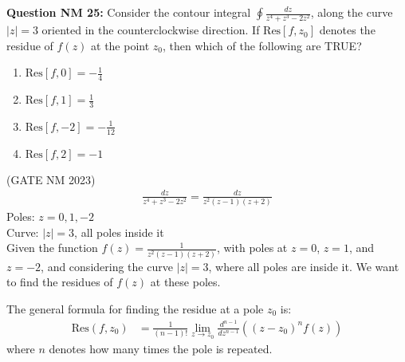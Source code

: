\documentclass[journal,12pt,twocolumn]{IEEEtran}
\theoremstyle{remark}
\begin{document}
\title{}
\author{Sasa Mardi, EE23BTECH11222}
\date{}
\maketitle

\textbf{Question NM 25:} Consider the contour integral $\oint \frac{dz}{z^4 + z^3 - 2z^2}$, along the curve $|z| = 3$ oriented in the counterclockwise direction. If $\text{Res}[f, z_0]$ denotes the residue of $f(z)$ at the point $z_0$, then which of the following are TRUE? \\
\begin{enumerate}
    \item $\text{Res}[f, 0] = -\frac{1}{4}$
    \item $\text{Res}[f, 1] = \frac{1}{3}$
    \item $\text{Res}[f, -2] = -\frac{1}{12}$
    \item $\text{Res}[f, 2] = -1$
\end{enumerate}
\hfill{(GATE NM 2023)}\\
\solution
\begin{align}
\frac{dz}{z^4 + z^3 - 2z^2} = \frac{dz}{z^2(z-1)(z+2)}
\end{align}
Poles: $z = 0, 1, -2$ \\
Curve: $|z| = 3$, all poles inside it \\
Given the function $f(z) = \frac{1}{z^2(z-1)(z+2)}$, with poles at $z = 0$, $z = 1$, and $z = -2$, and considering the curve $|z| = 3$, where all poles are inside it. We want to find the residues of $f(z)$ at these poles.

The general formula for finding the residue at a pole $z_0$ is:
\begin{align}
\text{Res}(f, z_0) &= \frac{1}{(n-1)!} \lim_{z \to z_0} \frac{d^{n-1}}{dz^{n-1}} \left( (z - z_0)^n f(z) \right)
\end{align}
where $n$ denotes how many times the pole is repeated.
\end{document}
